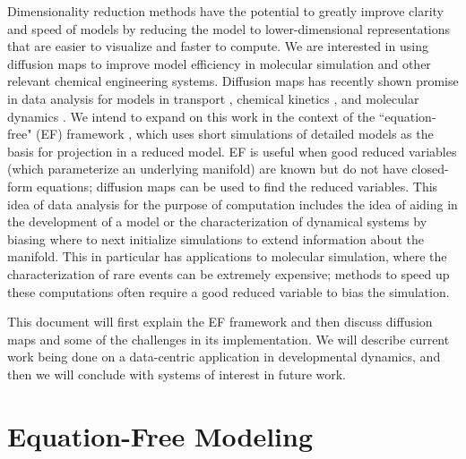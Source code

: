 \documentclass[12pt]{article}
\begin{document}
Dimensionality reduction methods have the potential to greatly improve clarity and speed of models by reducing the model to lower-dimensional representations that are easier to visualize and faster to compute. We are interested in using diffusion maps to improve model efficiency in molecular simulation and other relevant chemical engineering systems. Diffusion maps has recently shown promise in data analysis for models in transport \cite{Sonday2009}, chemical kinetics \cite{Chiavazzo2014}, and molecular dynamics \cite{Ferguson2010, Ferguson2011, Nedialkova2014, Kim2015}. We intend to expand on this work in the context of the ``equation-free" (EF) framework \cite{Kevrekidis2004}, which uses short simulations of detailed models as the basis for projection in a reduced model. EF is useful when good reduced variables (which parameterize an underlying manifold) are known but do not have closed-form equations; diffusion maps can be used to find the reduced variables. This idea of data analysis for the purpose of computation includes the idea of aiding in the development of a model or the characterization of dynamical systems by biasing where to next initialize simulations to extend information about the manifold. This in particular has applications to molecular simulation, where the characterization of rare events can be extremely expensive; methods to speed up these computations often require a good reduced variable to bias the simulation.\vspace{1mm}

This document will first explain the EF framework and then discuss diffusion maps and some of the challenges in its implementation. We will describe current work being done on a data-centric application in developmental dynamics, and then we will conclude with systems of interest in future work.\vspace{1mm}

\section{Equation-Free Modeling}
\end{document}
